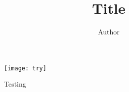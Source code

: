 \documentclass{article}
\title{Title}
\author{Author}
\begin{document}
	
	\maketitle

	\blindtext
	
\begin{figure}[ht]
	\centering
	\texttt{[image: try]}
	\caption{Testing}
	\label{fig:try}
\end{figure}

	\blindmathtrue
	\blindtext
	
	\blindmathfalse

	
	
\end{document}
